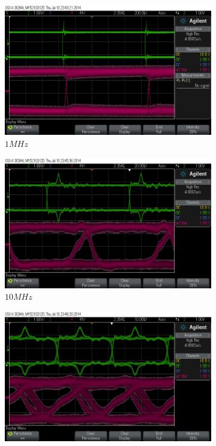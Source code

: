 \documentclass[12pt,a4paper]{article}
\begin{document}
\begin{figure}
  \centering
  \begin{subfigure}[b]{0.6\textwidth}
    \includegraphics[width=\textwidth]{../measurements/20140710/eye_plots/01MHz.png}
    \caption{$1MHz$}
  \end{subfigure}  
  \begin{subfigure}[b]{0.6\textwidth}
    \includegraphics[width=\textwidth]{../measurements/20140710/eye_plots/10MHz.png}
    \caption{$10MHz$}
  \end{subfigure}  
  \begin{subfigure}[b]{0.6\textwidth}
    \includegraphics[width=\textwidth]{../measurements/20140710/eye_plots/30MHz.png}

\end{subfigure}
\end{figure}
\end{document}

